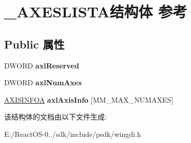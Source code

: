 \hypertarget{struct___a_x_e_s_l_i_s_t_a}{}\section{\+\_\+\+A\+X\+E\+S\+L\+I\+S\+T\+A结构体 参考}
\label{struct___a_x_e_s_l_i_s_t_a}
\subsection*{Public 属性}
\begin{DoxyCompactItemize}
\item 
\mbox{\label{struct___a_x_e_s_l_i_s_t_a_a636f320ae60cf31eaf495a00e2df84f6}} 
D\+W\+O\+RD {\bfseries axl\+Reserved}
\item 
\mbox{\label{struct___a_x_e_s_l_i_s_t_a_a8d0fa04aaecc095b3f021e241d96b26e}} 
D\+W\+O\+RD {\bfseries axl\+Num\+Axes}
\item 
\mbox{\label{struct___a_x_e_s_l_i_s_t_a_a35b2ccae3ae8a7a81de64f5879bd0a44}} 
\hyperlink{struct___a_x_i_s_i_n_f_o_a}{A\+X\+I\+S\+I\+N\+F\+OA} {\bfseries axl\+Axis\+Info} \mbox{[}M\+M\+\_\+\+M\+A\+X\+\_\+\+N\+U\+M\+A\+X\+ES\mbox{]}
\end{DoxyCompactItemize}


该结构体的文档由以下文件生成\+:\begin{DoxyCompactItemize}
\item 
E\+:/\+React\+O\+S-\/0../sdk/include/psdk/wingdi.\+h\end{DoxyCompactItemize}
